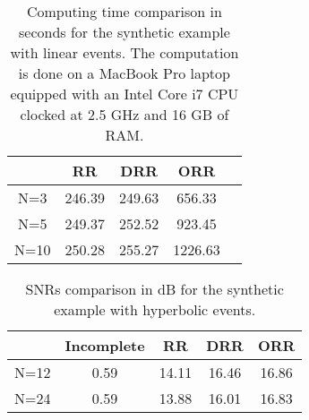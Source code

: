 \begin{table}[h]
\caption{Computing time comparison in seconds for the synthetic example with linear events. The computation is done on a MacBook Pro laptop equipped with an Intel Core i7 CPU clocked at 2.5 GHz and 16 GB of RAM.}
\begin{center}
     \begin{tabular}{|c|c|c|c|c|} 
	  \hline  & RR  & DRR  & ORR \\ 
	  \hline N=3    &246.39  & 249.63 & 656.33   \\	  
	  \hline N=5    &249.37  & 252.52 &    923.45\\
	  \hline N=10  &250.28  &  255.27 & 1226.63 \\
       \hline
    \end{tabular} 
\end{center}
\label{tbl:time}
\end{table}

\begin{table}[h]
\caption{SNRs comparison in dB for the synthetic example with hyperbolic events.}
\begin{center}
     \begin{tabular}{|c|c|c|c|c|} 
	  \hline &Incomplete  & RR  & DRR & ORR \\ 
	  \hline N=12& 0.59 & 14.11 & 16.46 & 16.86 \\
	  \hline N=24& 0.59 & 13.88 & 16.01 & 16.83 \\
       \hline
    \end{tabular} 
\end{center}
\label{tbl:hyper}
\end{table}
\newpage









